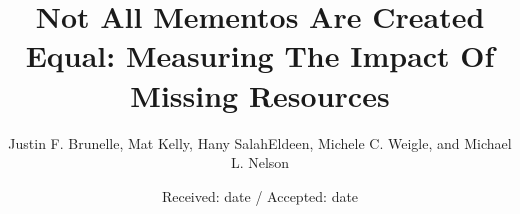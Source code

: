 %
%
%
%
%


\title{Not All Mementos Are Created Equal: Measuring The Impact Of Missing Resources}


\author{Justin F. Brunelle, Mat Kelly, Hany SalahEldeen, Michele C. Weigle, and Michael L. Nelson}

\date{Received: date / Accepted: date}


